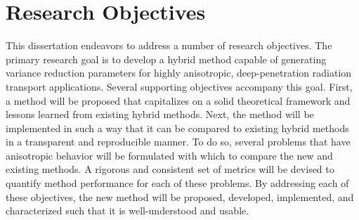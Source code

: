 \section{Research Objectives}
\label{sec:objectives}

This dissertation endeavors to address a number of research objectives. The
primary research goal is to develop a hybrid method capable of generating
variance reduction parameters for highly anisotropic,
deep-penetration radiation transport
applications. Several supporting objectives accompany this goal. First, a
method will be proposed that capitalizes on a solid theoretical framework
and lessons learned from existing hybrid methods.
Next, the method will be implemented in such a way that it can be compared to
existing hybrid methods in a transparent and reproducible manner. To do so,
several problems that have anisotropic behavior will be formulated with which to
compare the new and existing methods. A rigorous and consistent set of metrics
will be devised to quantify method performance for each of these problems. By
addressing each of these objectives, the new method will be
proposed, developed, implemented, and characterized such that it is
well-understood and usable.

